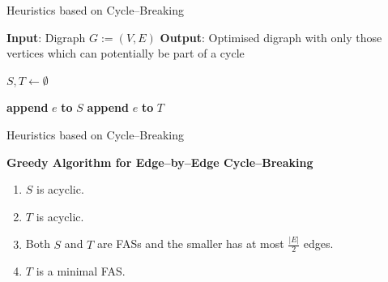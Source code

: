 \documentclass{beamer}
\begin{document}
\begin{frame}{Heuristics based on Cycle–Breaking}
    

    {\fontsize{3pt}{4pt}\selectfont
    \begin{algorithm}[H]

        \caption*{\textit{Greedy\_Edge\_By\_Edge}} 
        
        \begin{algorithmic}[1]

            \State \textbf{Input}: Digraph $G := (V,E)$
            \State \textbf{Output}: Optimised digraph with only those vertices which can potentially be part of a cycle

            \Statex

            \State $S, T \gets \emptyset$

            \Statex

                    \State \textbf{append} $e$ \textbf{to} $S$
                \Else
                    \State \textbf{append} $e$ \textbf{to} $T$
                \EndIf
            \EndFor

        \end{algorithmic}
    \end{algorithm}
    }

\end{frame}



\begin{frame}{Heuristics based on Cycle–Breaking}

    \textbf{Greedy Algorithm for Edge–by–Edge Cycle–Breaking}

    \begin{theorem}

        \begin{enumerate}
            
            \item $S$ is acyclic.
            \item $T$ is acyclic.
            \item Both $S$ and $T$ are FASs and the smaller has at most $\frac{|E|}{2}$ edges.
            \item $T$ is a minimal FAS.

        \end{enumerate}

    \end{theorem}



\end{frame}
\end{document}
